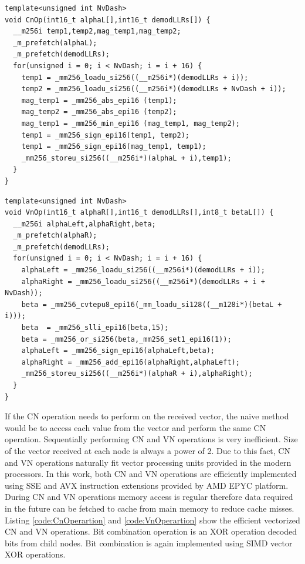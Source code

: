 \begin{code}
\label{code:CnOperartion}
\begin{verbatim}
template<unsigned int NvDash>
void CnOp(int16_t alphaL[],int16_t demodLLRs[]) {
  __m256i temp1,temp2,mag_temp1,mag_temp2;
  _m_prefetch(alphaL);
  _m_prefetch(demodLLRs);
  for(unsigned i = 0; i < NvDash; i = i + 16) {
	temp1 = _mm256_loadu_si256((__m256i*)(demodLLRs + i));
	temp2 = _mm256_loadu_si256((__m256i*)(demodLLRs + NvDash + i));
	mag_temp1 = _mm256_abs_epi16 (temp1);
	mag_temp2 = _mm256_abs_epi16 (temp2);
	mag_temp1 = _mm256_min_epi16 (mag_temp1, mag_temp2);
	temp1 = _mm256_sign_epi16(temp1, temp2);
	temp1 = _mm256_sign_epi16(mag_temp1, temp1);
	_mm256_storeu_si256((__m256i*)(alphaL + i),temp1);
  }
}
\end{verbatim}
\end{code}
\begin{code}
\label{code:VnOperartion}
\begin{verbatim}
template<unsigned int NvDash>
void VnOp(int16_t alphaR[],int16_t demodLLRs[],int8_t betaL[]) {
  __m256i alphaLeft,alphaRight,beta;
  _m_prefetch(alphaR);
  _m_prefetch(demodLLRs);
  for(unsigned i = 0; i < NvDash; i = i + 16) {
    alphaLeft = _mm256_loadu_si256((__m256i*)(demodLLRs + i));
    alphaRight = _mm256_loadu_si256((__m256i*)(demodLLRs + i + NvDash));
    beta = _mm256_cvtepu8_epi16(_mm_loadu_si128((__m128i*)(betaL + i)));
    beta  = _mm256_slli_epi16(beta,15);
    beta = _mm256_or_si256(beta,_mm256_set1_epi16(1));
    alphaLeft = _mm256_sign_epi16(alphaLeft,beta);
    alphaRight = _mm256_add_epi16(alphaRight,alphaLeft);
    _mm256_storeu_si256((__m256i*)(alphaR + i),alphaRight);
  }
}
\end{verbatim}
\end{code}
If the CN operation needs to perform on the received vector, the naive method would be to access each value from the vector and perform the same CN operation. Sequentially performing CN and VN operations is very inefficient. Size of the vector received at each node is always a power of 2. Due to this fact, CN and VN operations naturally fit vector processing units provided in the modern processors. In this work, both CN and VN operations are efficiently implemented using SSE and AVX instruction extensions provided by AMD EPYC platform. During CN and VN operations memory access is regular therefore data required in the future can be fetched to cache from main memory to reduce cache misses. Listing \ref{code:CnOperartion} and \ref{code:VnOperartion} show the efficient vectorized CN and VN operations. Bit combination operation is an XOR operation decoded bits from child nodes. Bit combination is again implemented using SIMD vector XOR operations.

